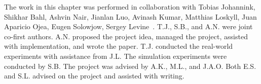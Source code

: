 The work in this chapter was performed in collaboration with Tobias Johannink, Shikhar Bahl, Ashvin Nair, Jianlan Luo, Avinash Kumar, Matthias Loskyll, Juan Aparicio Ojea, Eugen Solowjow, Sergey Levine~\citep{johannink18residualrl}. T.J., S.B., and A.N. were joint co-first authors. A.N. proposed the project idea, managed the project, assisted with implementation, and wrote the paper. T.J. conducted the real-world experiments with assistance from J.L. The simulation experiments were conducted by S.B. The project was advised by A.K., M.L., and J.A.O. Both E.S. and S.L. advised on the project and assisted with writing.



% 
% 

% 
